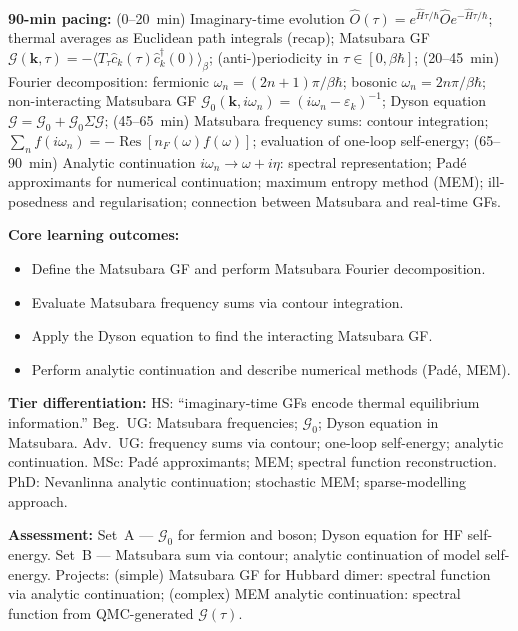 \documentclass[11pt,a4paper]{article}
\begin{document}
\medskip

\begin{tcolorbox}[modulebox, title={Module~II.7 --- Lecture L06: Imaginary-Time Formalism and Matsubara Green's Functions}]
\textbf{90-min pacing:} (0--20~min) Imaginary-time evolution $\hat{O}(\tau)=e^{\hat{H}\tau/\hbar}\hat{O}e^{-\hat{H}\tau/\hbar}$; thermal averages as Euclidean path integrals (recap); Matsubara GF $\mathcal{G}(\mathbf{k},\tau)=-\langle T_\tau\hat{c}_k(\tau)\hat{c}_k^\dagger(0)\rangle_\beta$; (anti-)periodicity in $\tau\in[0,\beta\hbar]$; (20--45~min) Fourier decomposition: fermionic $\omega_n=(2n+1)\pi/\beta\hbar$; bosonic $\omega_n=2n\pi/\beta\hbar$; non-interacting Matsubara GF $\mathcal{G}_0(\mathbf{k},i\omega_n)=(i\omega_n-\varepsilon_k)^{-1}$; Dyson equation $\mathcal{G}=\mathcal{G}_0+\mathcal{G}_0\Sigma\mathcal{G}$; (45--65~min) Matsubara frequency sums: contour integration; $\sum_n f(i\omega_n)=-\operatorname{Res}[n_F(\omega)f(\omega)]$; evaluation of one-loop self-energy; (65--90~min) Analytic continuation $i\omega_n\to\omega+i\eta$: spectral representation; Padé approximants for numerical continuation; maximum entropy method (MEM); ill-posedness and regularisation; connection between Matsubara and real-time GFs.

\medskip\textbf{Core learning outcomes:}
\begin{itemize}[leftmargin=1.4em,topsep=2pt,itemsep=1pt]
  \item Define the Matsubara GF and perform Matsubara Fourier decomposition.
  \item Evaluate Matsubara frequency sums via contour integration.
  \item Apply the Dyson equation to find the interacting Matsubara GF.
  \item Perform analytic continuation and describe numerical methods (Padé, MEM).
\end{itemize}

\medskip\textbf{Tier differentiation:}
HS: ``imaginary-time GFs encode thermal equilibrium information.''
Beg.\ UG: Matsubara frequencies; $\mathcal{G}_0$; Dyson equation in Matsubara.
Adv.\ UG: frequency sums via contour; one-loop self-energy; analytic continuation.
MSc: Padé approximants; MEM; spectral function reconstruction.
PhD: Nevanlinna analytic continuation; stochastic MEM; sparse-modelling approach.

\medskip\textbf{Assessment:}
Set~A --- $\mathcal{G}_0$ for fermion and boson; Dyson equation for HF self-energy.
Set~B --- Matsubara sum via contour; analytic continuation of model self-energy.
Projects: (simple) Matsubara GF for Hubbard dimer: spectral function via analytic continuation;
(complex) MEM analytic continuation: spectral function from QMC-generated $\mathcal{G}(\tau)$.
\end{tcolorbox}
\end{document}

